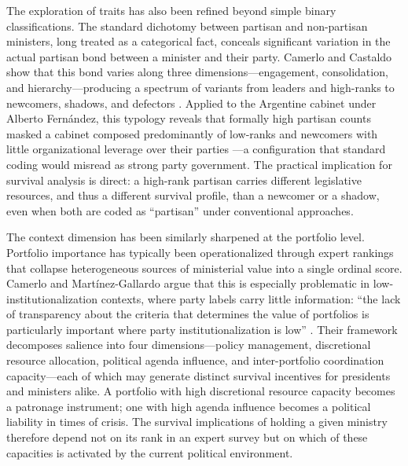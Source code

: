 \documentclass[doc, 12pt, a4paper,floatsintext]{apa7}
\begin{document}
The exploration of traits has also been refined beyond simple binary classifications.
The standard dichotomy between partisan and non-partisan ministers, long treated as a
categorical fact, conceals significant variation in the actual partisan bond between a
minister and their party. Camerlo and Castaldo show that this bond varies along three
dimensions---engagement, consolidation, and hierarchy---producing a spectrum of
variants from leaders and high-ranks to newcomers, shadows, and defectors
\parencite{camerlo_government_2024}. Applied to the Argentine cabinet under Alberto Fernández,
this typology reveals that formally high partisan counts masked a cabinet composed
predominantly of low-ranks and newcomers with little organizational leverage over their
parties \parencite{camerlo_poderes_2024}---a configuration that standard coding would misread
as strong party government. The practical implication for survival analysis is direct: a
high-rank partisan carries different legislative resources, and thus a different survival
profile, than a newcomer or a shadow, even when both are coded as ``partisan'' under
conventional approaches.

The context dimension has been similarly sharpened at the portfolio level. Portfolio
importance has typically been operationalized through expert rankings that collapse
heterogeneous sources of ministerial value into a single ordinal score. Camerlo and
Martínez-Gallardo argue that this is especially problematic in low-institutionalization
contexts, where party labels carry little information: ``the lack of transparency about the
criteria that determines the value of portfolios is particularly important where party
institutionalization is low'' \parencite[6]{camerlo_por_2022}. Their framework
decomposes salience into four dimensions---policy management, discretional resource
allocation, political agenda influence, and inter-portfolio coordination capacity---each of
which may generate distinct survival incentives for presidents and ministers alike.
A portfolio with high discretional resource capacity becomes a patronage instrument;
one with high agenda influence becomes a political liability in times of crisis. The survival
implications of holding a given ministry therefore depend not on its rank in an expert
survey but on which of these capacities is activated by the current political environment.
\end{document}
